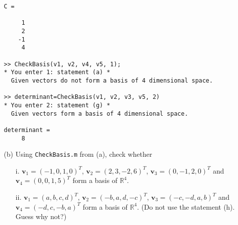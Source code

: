 \begin{exer}
\begin{enumerate}
\begin{verbatim}
C =

     1
     2
    -1
     4

>> CheckBasis(v1, v2, v4, v5, 1);
* You enter 1: statement (a) *
  Given vectors do not form a basis of 4 dimensional space.

>> determinant=CheckBasis(v1, v2, v3, v5, 2)
* You enter 2: statement (g) *
  Given vectors form a basis of 4 dimensional space.

determinant =
     8
\end{verbatim}

\vspace{3mm}
\item[(b)] Using \verb"CheckBasis.m" from (a), check whether
\begin{itemize}
\item[i.] $\mathbf{v}_{1}=(-1, 0, 1, 0)^{T}$, $\mathbf{v}_{2}=(2, 3, -2, 6)^{T}$, $\mathbf{v}_{3}=(0, -1, 2, 0)^{T}$ and $\mathbf{v}_{4}=(0, 0, 1, 5)^{T}$ form a basis of $\mathbb{R}^4$.

\item[ii.] $\mathbf{v}_{1}=(a, b, c, d)^{T}$, $\mathbf{v}_{2}=(-b, a, d, -c)^{T}$, $\mathbf{v}_{3}=(-c, -d, a, b)^{T}$ and $\mathbf{v}_{4}=(-d, c, -b, a)^{T}$ form a basis of $\mathbb{R}^4$. (Do not use the statement (h). Guess why not?)
\end{itemize}

\end{enumerate}
\end{exer}


